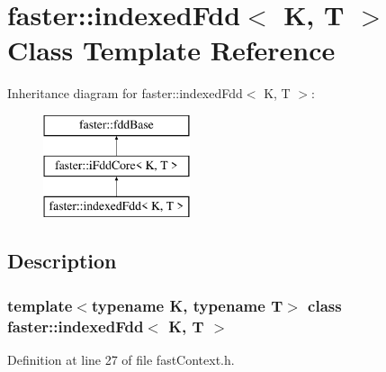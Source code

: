\hypertarget{classfaster_1_1indexedFdd}{}\section{faster\+:\+:indexed\+Fdd$<$ K, T $>$ Class Template Reference}
\label{classfaster_1_1indexedFdd}
Inheritance diagram for faster\+:\+:indexed\+Fdd$<$ K, T $>$\+:\begin{figure}[H]
\begin{center}
\leavevmode
\includegraphics[height=3.000000cm]{classfaster_1_1indexedFdd}
\end{center}
\end{figure}


\subsection{Description}
\subsubsection*{template$<$typename K, typename T$>$\newline
class faster\+::indexed\+Fdd$<$ K, T $>$}



Definition at line 27 of file fast\+Context.\+h.

